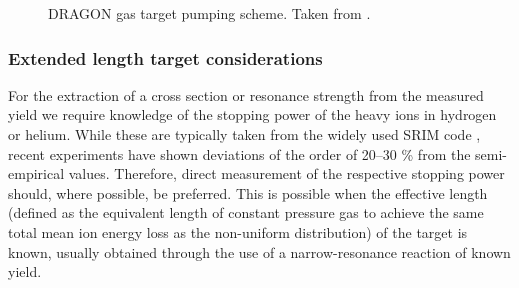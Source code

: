 \begin{figure}
\caption{DRAGON gas target pumping scheme. Taken from \cite{hutc03b}.}
\label{fig:dragon_pumping}
\end{figure}

\subsubsection{Extended length target considerations}
For the extraction of a cross section or resonance strength from the measured yield we require knowledge of the stopping power of the heavy ions in hydrogen or helium. While these are typically taken from the widely used SRIM code \cite{zieg}, recent experiments \cite{grei04} have shown deviations of the order of 20--30 \% from the semi-empirical values. Therefore, direct measurement of the respective stopping power should, where possible, be preferred. This is possible when the effective length (defined as the equivalent length of constant pressure gas to achieve the same total mean ion energy loss as the non-uniform distribution) of the target is known, usually obtained through the use of a narrow-resonance reaction of known yield. 

